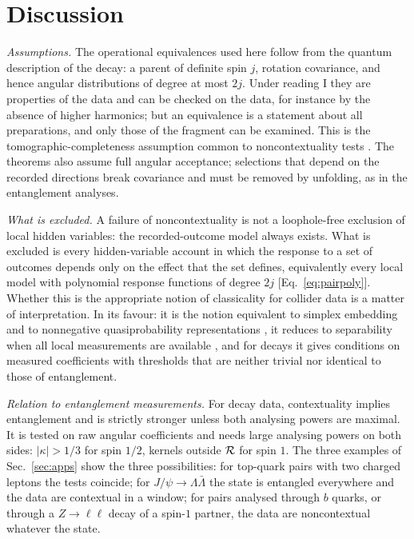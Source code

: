 \section{Discussion}
\label{sec:discussion}

\emph{Assumptions.} The operational equivalences used here follow from the quantum description of the decay: a parent of definite spin $j$, rotation covariance, and hence angular distributions of degree at most $2j$. Under reading I they are properties of the data and can be checked on the data, for instance by the absence of higher harmonics; but an equivalence is a statement about all preparations, and only those of the fragment can be examined. This is the tomographic-completeness assumption common to noncontextuality tests \cite{mazurek2016,pusey2018}. The theorems also assume full angular acceptance; selections that depend on the recorded directions break covariance and must be removed by unfolding, as in the entanglement analyses.

\emph{What is excluded.} A failure of noncontextuality is not a loophole-free exclusion of local hidden variables: the recorded-outcome model always exists. What is excluded is every hidden-variable account in which the response to a set of outcomes depends only on the effect that the set defines, equivalently every local model with polynomial response functions of degree $2j$ [Eq.~\eqref{eq:pairpoly}]. Whether this is the appropriate notion of classicality for collider data is a matter of interpretation. In its favour: it is the notion equivalent to simplex embedding and to nonnegative quasiprobability representations \cite{schmid2021,spekkens2008}, it reduces to separability when all local measurements are available \cite{plavala2024}, and for decays it gives conditions on measured coefficients with thresholds that are neither trivial nor identical to those of entanglement.

\emph{Relation to entanglement measurements.} For decay data, contextuality implies entanglement and is strictly stronger unless both analysing powers are maximal. It is tested on raw angular coefficients and needs large analysing powers on both sides: $|\kappa|>1/3$ for spin $1/2$, kernels outside $\mathcal{R}$ for spin $1$. The three examples of Sec.~\ref{sec:apps} show the three possibilities: for top-quark pairs with two charged leptons the tests coincide; for $J/\psi\to\Lambda\bar\Lambda$ the state is entangled everywhere and the data are contextual in a window; for pairs analysed through $b$ quarks, or through a $Z\to\ell\ell$ decay of a spin-$1$ partner, the data are noncontextual whatever the state.

